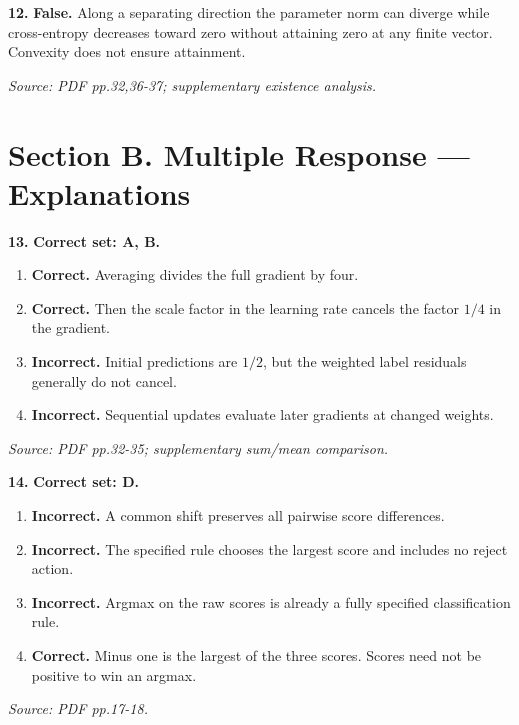\documentclass[11pt,a4paper]{article}
\begin{document}
\par\noindent\begin{minipage}{\linewidth}
\textbf{12.} \textbf{False.} Along a separating direction the parameter norm can diverge while cross-entropy decreases toward zero without attaining zero at any finite vector. Convexity does not ensure attainment.

{\footnotesize\textit{Source: PDF pp.32,36-37; supplementary existence analysis.}}
\end{minipage}\par\vspace{3mm}
\newpage\section*{Section B. Multiple Response --- Explanations}
\par\noindent\begin{minipage}{\linewidth}
\textbf{13.} \textbf{Correct set: A, B.}
\begin{enumerate}[label=(\Alph*),leftmargin=8mm,itemsep=2pt,topsep=2pt]
\item \textbf{Correct.} Averaging divides the full gradient by four.
\item \textbf{Correct.} Then the scale factor in the learning rate cancels the factor \(1/4\) in the gradient.
\item \textbf{Incorrect.} Initial predictions are \(1/2\), but the weighted label residuals generally do not cancel.
\item \textbf{Incorrect.} Sequential updates evaluate later gradients at changed weights.
\end{enumerate}
{\footnotesize\textit{Source: PDF pp.32-35; supplementary sum/mean comparison.}}

\end{minipage}\par\vspace{3mm}
\par\noindent\begin{minipage}{\linewidth}
\textbf{14.} \textbf{Correct set: D.}
\begin{enumerate}[label=(\Alph*),leftmargin=8mm,itemsep=2pt,topsep=2pt]
\item \textbf{Incorrect.} A common shift preserves all pairwise score differences.
\item \textbf{Incorrect.} The specified rule chooses the largest score and includes no reject action.
\item \textbf{Incorrect.} Argmax on the raw scores is already a fully specified classification rule.
\item \textbf{Correct.} Minus one is the largest of the three scores. Scores need not be positive to win an argmax.
\end{enumerate}
{\footnotesize\textit{Source: PDF pp.17-18.}}

\end{minipage}\par\vspace{3mm}
\end{document}

